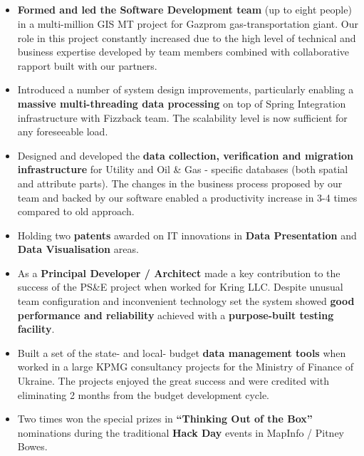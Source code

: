 \documentclass{res}
\newcommand{\emp}[1]{{\bf#1}}
\newcommand{\osection}[1]{\section{\sc {\Large \textbf{#1}\\}} \vspace{0.30cm}}
\begin{document}
\begin{resume}
\osection{Career Highlights}
\begin{itemize}
\item \emp{Formed and led the Software Development team} (up to eight people) in a multi-million GIS MT project for Gazprom gas-transportation giant. Our role in this project constantly increased due to the high level of technical and business expertise developed by team members combined with collaborative rapport built with our partners.
\item Introduced a number of system design improvements, particularly enabling a \emp{massive multi-threading data processing} on top of Spring Integration infrastructure with Fizzback team. The scalability level is now sufficient for any foreseeable load.
\item Designed and developed the \emp{data collection, verification and migration infrastructure} for Utility and Oil \& Gas - specific databases (both spatial and attribute parts). The changes in the business process proposed by our team and backed by our software enabled a productivity increase in 3-4 times compared to old approach.
\item Holding two \emp{patents} awarded on IT innovations in \emp{Data Presentation} and \emp{Data Visualisation} areas.
\item As a \emp{Principal Developer / Architect} made a key contribution to the success of the PS\&E project when worked for Kring LLC. Despite unusual team configuration and inconvenient technology set the system showed \emp{good performance and reliability} achieved with a \emp{purpose-built testing facility}.
\item Built a set of the state- and local- budget \emp{data management tools} when worked in a large KPMG consultancy projects for the Ministry of Finance of Ukraine. The projects enjoyed the great success and were credited with eliminating 2 months from the budget development cycle.
\item Two times won the special prizes in \emp{``Thinking Out of the Box''} nominations during the traditional \emp{Hack Day} events in MapInfo / Pitney Bowes.
\end{itemize}


\end{resume}
\end{document}
